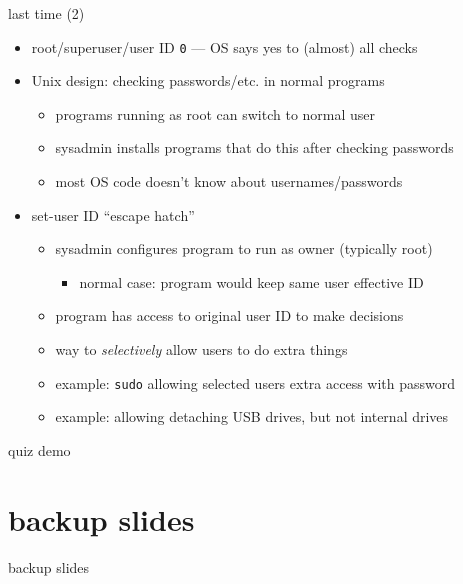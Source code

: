 \begin{frame}{last time (2)}
    \begin{itemize}
    \item root/superuser/user ID \texttt{0} --- OS says yes to (almost) all checks
    \item Unix design: checking passwords/etc. in normal programs
        \begin{itemize}
        \item programs running as root can switch to normal user
        \item sysadmin installs programs that do this after checking passwords
        \item most OS code doesn't know about usernames/passwords
        \end{itemize}
    \item set-user ID ``escape hatch''
        \begin{itemize}
        \item sysadmin configures program to run as owner (typically root)
            \begin{itemize}
            \item normal case: program would keep same user effective ID
            \end{itemize}
        \item program has access to original user ID to make decisions
        \item way to \textit{selectively} allow users to do extra things
        \item example: \texttt{sudo} allowing selected users extra access with password
        \item example: allowing detaching USB drives, but not internal drives
        \end{itemize}
    \end{itemize}
\end{frame}

\begin{frame}{quiz demo}
\end{frame}







\section{backup slides}
\begin{frame}{backup slides}
\end{frame}




